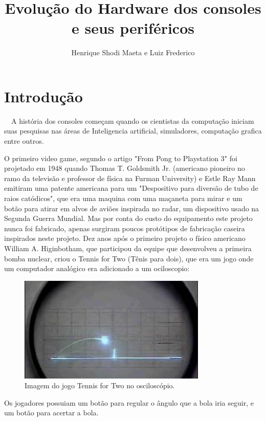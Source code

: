 \documentclass[12pt]{article}
\title{Evoluç\~{a}o do Hardware dos consoles e seus periféricos}
\author{Henrique Shodi Maeta e Luiz Frederico}
\begin{document}
 

\maketitle

\begin{abstract}

  
\end{abstract}
     
\begin{resumo} 
\end{resumo}


\section{Introdu\c c\~{a}o}

\ \ A história dos consoles começam quando os cientistas da computaç\~{a}o iniciam suas pesquisas nas áreas de Inteligencia artificial, simuladores, computaç\~{a}o grafica entre outros.
 
 O primeiro video game, segundo o artigo "From Pong to Playstation 3" \cite{pong-play} foi projetado em 1948 quando Thomas T. Goldsmith Jr. (americano pioneiro no ramo da televis\~{a}o e professor de física na Furman University) e Estle Ray Mann emitiram uma patente americana para um "Despositivo para divers\~{a}o de tubo de raios catódicos", que era uma maquina com uma maçaneta para mirar e um bot\~{a}o para atirar em alvos de avi\~{o}es inspirada no radar, um dispositivo usado na Segunda Guerra Mundial. Mas por conta do custo do equipamento este projeto nunca foi fabricado, apenas surgiram poucos protótipos de fabricaç\~{a}o caseira inspirados neste projeto.
 Dez anos após o primeiro projeto o físico americano William A. Higinbotham, que participou da equipe que desenvolveu a primeira bomba nuclear, criou o Tennis for Two (Tênis para dois), que era um jogo onde um computador analógico era adicionado a um ociloscopio:
\linebreak
\begin{figure}[!htb]
    \centering
    \includegraphics[width=0.8\textwidth]{osciloscopio.jpg}
    \caption{Imagem do jogo Tennis for Two no osciloscópio.}
    \label{fig:osciloscopio}
\end{figure}
\linebreak
 Os jogadores possuiam um bot\~{a}o para regular o ângulo que a bola iria seguir, e um bot\~{a}o para acertar a bola.
 
\end{document}
